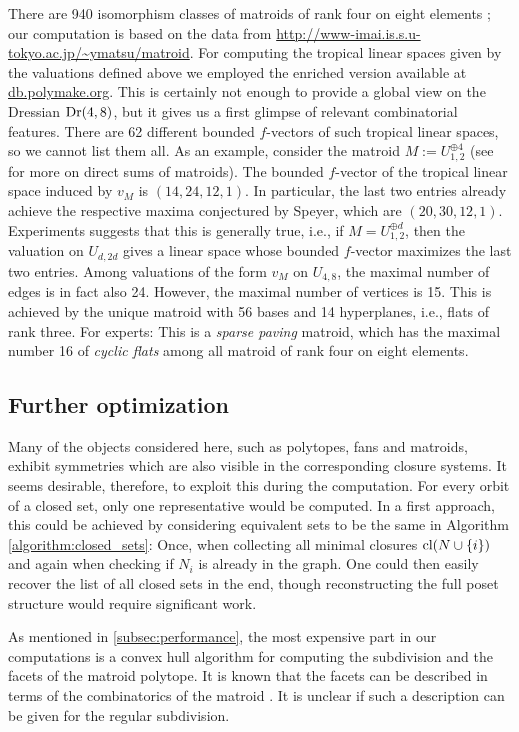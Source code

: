 \documentclass[11pt,a4paper]{amsart}
\theoremstyle{definition}
\theoremstyle{plain}
\begin{document}
There are 940 isomorphism classes of matroids of rank four on eight elements \cite{Matsumotoetal:2012}; our computation is based on the data from \url{http://www-imai.is.s.u-tokyo.ac.jp/~ymatsu/matroid}.
For computing the tropical linear spaces given by the valuations defined above we employed the enriched version available at \url{db.polymake.org}.
This is certainly not enough to provide a global view on the Dressian ${\textnormal{Dr}}(4,8)$, but it gives us a first glimpse of relevant combinatorial features.
There are 62 different bounded $f$-vectors of such tropical linear spaces, so we cannot list them all. As an example, consider the matroid $M := U_{1,2}^{\oplus 4}$ (see \cite[Chapter 4.2]{Oxley:2011} for more on direct sums of matroids). The bounded $f$-vector of the tropical linear space induced by $v_M$ is $(14,24,12,1)$. 
In particular, the last two entries already achieve the respective maxima conjectured by Speyer, which are $(20,30,12,1)$. 
Experiments suggests that this is generally true, i.e., if $M = U_{1,2}^{\oplus d}$, then the valuation on $U_{d,2d}$ gives a linear space whose bounded $f$-vector maximizes the last two entries.
Among valuations of the form $v_M$ on $U_{4,8}$, the maximal number of edges is in fact also 24.
However, the maximal number of vertices is 15. This is achieved by the unique matroid with 56 bases and 14 hyperplanes, i.e., flats of rank three. For experts: This is a \emph{sparse paving} matroid, which has the maximal number 16 of \emph{cyclic flats} among all matroid of rank four on eight elements.

\subsection{Further optimization}

Many of the objects considered here, such as polytopes, fans and matroids, exhibit symmetries which are also visible in the corresponding closure systems. It seems desirable, therefore, to exploit this during the computation. For every orbit of a closed set, only one representative would be computed. In a first approach, this could be achieved by considering equivalent sets to be the same in Algorithm \ref{algorithm:closed_sets}: Once, when collecting all minimal closures ${\textnormal{cl}}(N \cup \{i\})$ and again when checking if $N_i$ is already in the graph.
One could then easily recover the list of all closed sets in the end, though reconstructing the full poset structure would require significant work.

As mentioned in \ref{subsec:performance}, the most expensive part in our computations is a convex hull algorithm for computing the subdivision and the facets of the matroid polytope. It is known that the facets can be described in terms of the combinatorics of the matroid \cite{FeichtnerSturmfels:2005}. 
It is unclear if such a description can be given for the regular subdivision.




 
\end{document}
